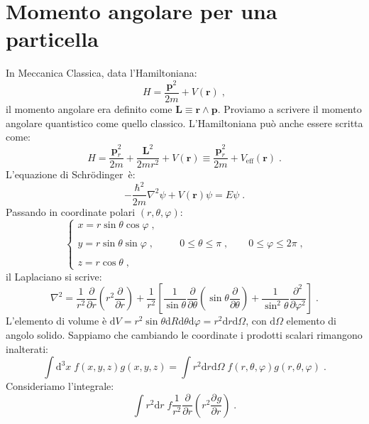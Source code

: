 \documentclass[12pt,a4paper]{report}
\theoremstyle{definition}
\newcommand{\pdev}[3][]{\frac{\partial^{#1} #2}{\partial #3^{#1}}}
\numberwithin{equation}{section}
\newcommand{\diff}[1][]{\mathrm{d}#1}
\newcommand{\Sch}{Schrödinger}
\begin{document}
\section{Momento angolare per una particella}
In Meccanica Classica, data l'Hamiltoniana:
\begin{equation}
H=\frac{\mathbf{p}^2}{2m}+V(\mathbf{r})\;,
\end{equation}
il momento angolare era definito come $\mathbf{L}\equiv\mathbf{r}\wedge \mathbf{p}$. Proviamo a scrivere il momento angolare quantistico come quello classico. L'Hamiltoniana può anche essere scritta come:
\begin{equation}
H=\frac{\mathbf{p}_r^2}{2m}+\frac{\mathbf{L}^2}{2mr^2}+V(\mathbf{r})\equiv \frac{\mathbf{p}_r^2}{2m}+V_{\mathrm{eff}}(\mathbf{r})\;.
\end{equation}
L'equazione di \Sch\, è:
\begin{equation}
-\frac{\hbar^2}{2m}\nabla^2\psi+V(\mathbf{r})\psi=E\psi\;.
\end{equation}
Passando in coordinate polari $(r,\theta,\varphi)$:
\begin{equation}
\begin{cases}
x=r\sin\theta\cos\varphi\;, \\
\\
y=r\sin\theta\sin\varphi\;, \\
\\
z=r\cos\theta\;,
\end{cases} \qquad 0\le\theta\le\pi\;, \qquad 0\le\varphi\le 2\pi\;,
\end{equation}
il Laplaciano si scrive:
\begin{equation}
\nabla^2=\frac{1}{r^2}\frac{\partial}{\partial r}\left(r^2\frac{\partial}{\partial r}\right)+\frac{1}{r^2}\left[\frac{1}{\sin\theta}\frac{\partial}{\partial\theta}\left(\sin\theta\frac{\partial}{\partial\theta}\right)+\frac{1}{\sin^2\theta}\frac{\partial^2}{\partial\varphi^2}\right]\;.
\end{equation}
L'elemento di volume è $\diff{V}=r^2\sin\theta\diff{R}\diff{\theta}\diff{\varphi}=r^2\diff{r}\diff{\Omega}$, con $\diff{\Omega}$ elemento di angolo solido. Sappiamo che cambiando le coordinate i prodotti scalari rimangono inalterati:
\begin{equation}
\int\diff^3{x}\;f(x,y,z)g(x,y,z)=\int r^2\diff{r}\diff{\Omega}\; f(r,\theta,\varphi)g(r,\theta,\varphi)\;.
\end{equation}
Consideriamo l'integrale:
\begin{equation}
\int r^2\diff{r}\; f\frac{1}{r^2}\frac{\partial}{\partial r}\left(r^2\pdev{g}{r}\right)\;.
\end{equation}
\end{document}
